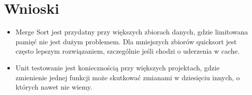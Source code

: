 	\newpage
\section{Wnioski}	%

\begin{itemize}
	\item Merge Sort jest przydatny przy większych zbiorach danych, gdzie limitowana pamięć nie jest dużym problemem. Dla mniejszych zbiorów quicksort jest często lepszym rozwiązaniem, szczególnie jeśli chodzi o uderzenia w cache.
	
	\item Unit testowanie jest koniecznością przy większych projektach, gdzie zmienienie jednej funkcji może skutkować zmianami w dziesięciu innych, o których nawet nie wiemy.
\end{itemize}

